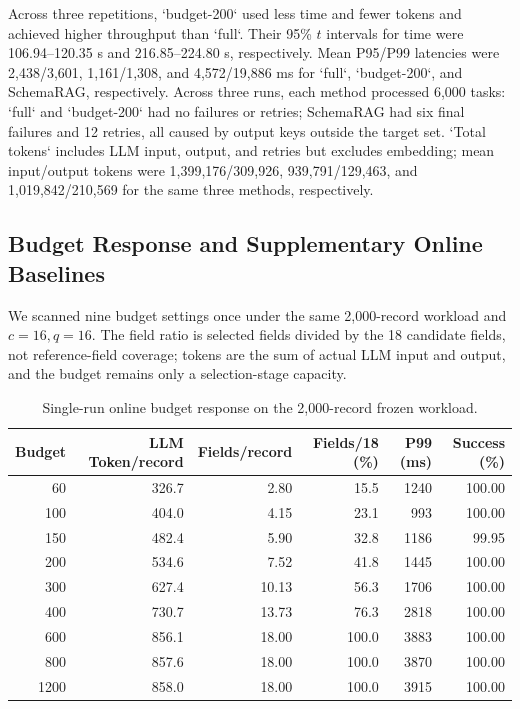 \documentclass[runningheads]{llncs}
\newcommand{\schemarag}{SchemaRAG}
\begin{document}
\begin{sloppypar}
Across three repetitions, `budget-200` used less time and fewer tokens and achieved higher throughput than `full`. Their 95\% $t$ intervals for time were 106.94--120.35 s and 216.85--224.80 s, respectively. Mean P95/P99 latencies were 2,438/3,601, 1,161/1,308, and 4,572/19,886 ms for `full`, `budget-200`, and \schemarag{}, respectively. Across three runs, each method processed 6,000 tasks: `full` and `budget-200` had no failures or retries; \schemarag{} had six final failures and 12 retries, all caused by output keys outside the target set. `Total tokens` includes LLM input, output, and retries but excludes embedding; mean input/output tokens were 1,399,176/309,926, 939,791/129,463, and 1,019,842/210,569 for the same three methods, respectively.
\end{sloppypar}

\subsection{Budget Response and Supplementary Online Baselines}

We scanned nine budget settings once under the same 2,000-record workload and $c=16,q=16$. The field ratio is selected fields divided by the 18 candidate fields, not reference-field coverage; tokens are the sum of actual LLM input and output, and the budget remains only a selection-stage capacity.

\begin{table}[htbp]\centering\scriptsize\setlength{\tabcolsep}{3pt}
\caption{Single-run online budget response on the 2,000-record frozen workload.}\label{tab:budget-response}
\begin{tabular}{@{}rrrrrr@{}}\toprule
Budget & LLM Token/record & Fields/record & Fields/18 (\%) & P99 (ms) & Success (\%)\\\midrule
60 & 326.7 & 2.80 & 15.5 & 1240 & 100.00\\
100 & 404.0 & 4.15 & 23.1 & 993 & 100.00\\
150 & 482.4 & 5.90 & 32.8 & 1186 & 99.95\\
200 & 534.6 & 7.52 & 41.8 & 1445 & 100.00\\
300 & 627.4 & 10.13 & 56.3 & 1706 & 100.00\\
400 & 730.7 & 13.73 & 76.3 & 2818 & 100.00\\
600 & 856.1 & 18.00 & 100.0 & 3883 & 100.00\\
800 & 857.6 & 18.00 & 100.0 & 3870 & 100.00\\
1200 & 858.0 & 18.00 & 100.0 & 3915 & 100.00\\\bottomrule
\end{tabular}\end{table}
\end{document}
